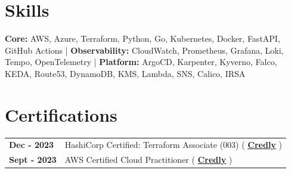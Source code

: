 \documentclass[a4,10pt]{article}
\newcommand{\hskills}[1]{
\textbf{\bfseries #1} }
\begin{document}
\section{Skills}
\textbf{Core:} AWS, Azure, Terraform, Python, Go, Kubernetes, Docker, FastAPI, GitHub Actions | \textbf{Observability:} CloudWatch, Prometheus, Grafana, Loki, Tempo, OpenTelemetry | \textbf{Platform:} ArgoCD, Karpenter, Kyverno, Falco, KEDA, Route53, DynamoDB, KMS, Lambda, SNS, Calico, IRSA
\vspace{-0.25cm}
\section{Certifications}
\begin{tabular}[t]{ p{10em} p{46em}}
\hskills{Dec - 2023} & HashiCorp Certified: Terraform Associate (003) \hfill(\hskills{\href{https://www.credly.com/badges/814918e9-fc9f-4fde-8ea0-5df068b66902}{Credly} }) \\ %
\hskills{Sept - 2023} & AWS Certified Cloud Practitioner \hfill(\hskills{\href{https://www.credly.com/badges/77765962-e64e-445f-9d74-eb272f5d6923}{Credly} })\\
\end{tabular} 
\end{document}
